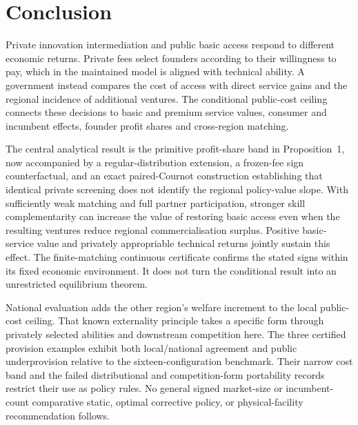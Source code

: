 \section{Conclusion}\label{sec:conclusion}
Private innovation intermediation and public basic access respond to different economic returns. Private fees select founders according to their willingness to pay, which in the maintained model is aligned with technical ability. A government instead compares the cost of access with direct service gains and the regional incidence of additional ventures. The conditional public-cost ceiling connects these decisions to basic and premium service values, consumer and incumbent effects, founder profit shares and cross-region matching.

The central analytical result is the primitive profit-share band in Proposition~1, now accompanied by a regular-distribution extension, a frozen-fee sign counterfactual, and an exact paired-Cournot construction establishing that identical private screening does not identify the regional policy-value slope. With sufficiently weak matching and full partner participation, stronger skill complementarity can increase the value of restoring basic access even when the resulting ventures reduce regional commercialisation surplus. Positive basic-service value and privately appropriable technical returns jointly sustain this effect. The finite-matching continuous certificate confirms the stated signs within its fixed economic environment. It does not turn the conditional result into an unrestricted equilibrium theorem.

National evaluation adds the other region's welfare increment to the local public-cost ceiling. That known externality principle takes a specific form through privately selected abilities and downstream competition here. The three certified provision examples exhibit both local/national agreement and public underprovision relative to the sixteen-configuration benchmark. Their narrow cost band and the failed distributional and competition-form portability records restrict their use as policy rules. No general signed market-size or incumbent-count comparative static, optimal corrective policy, or physical-facility recommendation follows.

